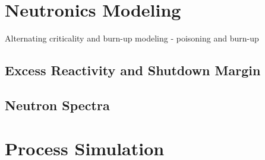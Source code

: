 \section{Neutronics Modeling}
Alternating criticality and burn-up modeling - poisoning and burn-up

\subsection{Excess Reactivity and Shutdown Margin}


\subsection{Neutron Spectra}

\section{Process Simulation}